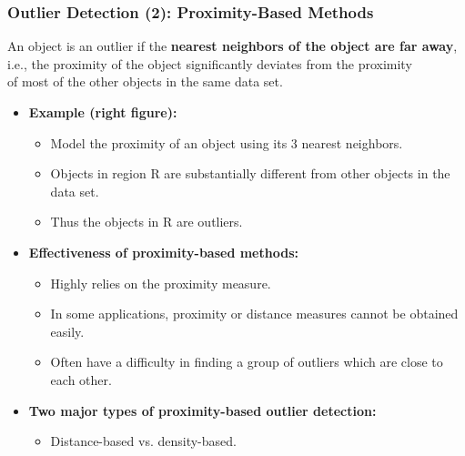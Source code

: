 \begin{frame}
  \frametitle{Outlier Detection (2): Proximity-Based Methods}

  An object is an outlier if the \textbf{\color{airforceblue}nearest neighbors of the object are far away},\\ i.e., the proximity of the object significantly deviates from the proximity\\ of most of the other objects in the same data set.
  \begin{itemize}

  \item \textbf{Example (right figure):}
    \begin{itemize}
    \item Model the proximity of an object using its 3 nearest neighbors.
    \item Objects in region R are substantially different from other objects in the data set.
    \item Thus the objects in R are outliers.
    \end{itemize}
  \item \textbf{Effectiveness of proximity-based methods:}
    \begin{itemize}
    \item Highly relies on the proximity measure.
    \item In some applications, proximity or distance measures cannot be obtained easily.
    \item Often have a difficulty in finding a group of outliers which are close to each other.
    \end{itemize}
  \item \textbf{Two major types of proximity-based outlier detection:}
    \begin{itemize}
    \item Distance-based vs. density-based.
    \end{itemize}
  \end{itemize}


\end{frame}
